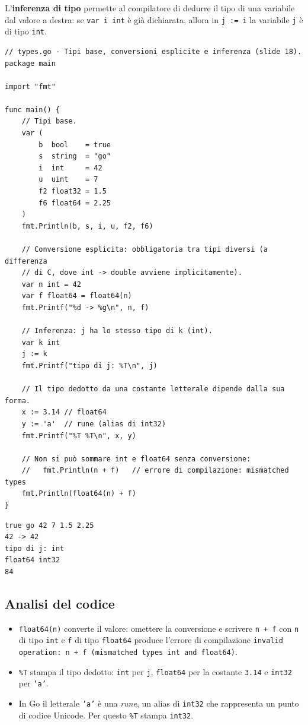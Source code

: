 \documentclass[11pt,a4paper]{report}
\newcommand{\cod}[1]{\texttt{#1}}
\begin{document}
L'\textbf{inferenza di tipo} permette al compilatore di dedurre il tipo di una
variabile dal valore a destra: se \cod{var i int} è già dichiarata, allora in
\cod{j := i} la variabile \cod{j} è di tipo \cod{int}.

\begin{lstlisting}[style=gocode,caption={\texttt{01\_basics/types.go}}]
// types.go - Tipi base, conversioni esplicite e inferenza (slide 18).
package main

import "fmt"

func main() {
	// Tipi base.
	var (
		b  bool    = true
		s  string  = "go"
		i  int     = 42
		u  uint    = 7
		f2 float32 = 1.5
		f6 float64 = 2.25
	)
	fmt.Println(b, s, i, u, f2, f6)

	// Conversione esplicita: obbligatoria tra tipi diversi (a differenza
	// di C, dove int -> double avviene implicitamente).
	var n int = 42
	var f float64 = float64(n)
	fmt.Printf("%d -> %g\n", n, f)

	// Inferenza: j ha lo stesso tipo di k (int).
	var k int
	j := k
	fmt.Printf("tipo di j: %T\n", j)

	// Il tipo dedotto da una costante letterale dipende dalla sua forma.
	x := 3.14 // float64
	y := 'a'  // rune (alias di int32)
	fmt.Printf("%T %T\n", x, y)

	// Non si può sommare int e float64 senza conversione:
	//   fmt.Println(n + f)   // errore di compilazione: mismatched types
	fmt.Println(float64(n) + f)
}
\end{lstlisting}
\begin{lstlisting}[style=output]
true go 42 7 1.5 2.25
42 -> 42
tipo di j: int
float64 int32
84
\end{lstlisting}

\subsection{Analisi del codice}

\begin{itemize}
  \item \cod{float64(n)} converte il valore: omettere la conversione e scrivere
        \cod{n + f} con \cod{n} di tipo \cod{int} e \cod{f} di tipo \cod{float64}
        produce l'errore di compilazione
        \texttt{invalid operation: n + f (mismatched types int and float64)}.
  \item \cod{\%T} stampa il tipo dedotto: \cod{int} per \cod{j}, \cod{float64} per la
        costante \cod{3.14} e \cod{int32} per \cod{'a'}.
  \item In Go il letterale \cod{'a'} è una \emph{rune}, un alias di
        \cod{int32} che rappresenta un punto di codice Unicode. Per questo
        \cod{\%T} stampa \cod{int32}.
\end{itemize}
\end{document}
